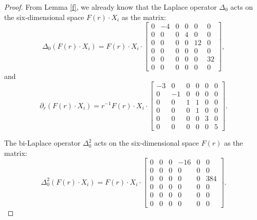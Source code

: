 \documentclass[11pt,letterpaper]{amsart}
\theoremstyle{definition}
\theoremstyle{remark}
\numberwithin{equation}{section}
\begin{document}
\begin{proof}
    From Lemma \ref{f}, we already know that 
    the Laplace operator $\Delta_0$ acts on the six-dimensional space $F(r)\cdot X_i$ as the matrix:
\begin{equation}
    \Delta_0(F(r)\cdot X_i)=F(r)\cdot X_i\cdot 
    \begin{bmatrix}
0 & -4 & 0 & 0 & 0& 0\\
0 & 0 & 0 & 4 & 0& 0\\
0 & 0 & 0 & 0 & 12& 0\\
0 & 0 & 0 & 0 & 0& 0\\
0 & 0 & 0 & 0 & 0& 32\\
0 & 0 & 0 & 0 & 0& 0
\end{bmatrix},
\end{equation}
and
\begin{equation*}
        \partial_r \left(F(r)\cdot X_i\right)=r^{-1}F(r)\cdot X_i\cdot\begin{bmatrix}
-3 & 0 & 0 & 0 & 0& 0\\
0 & -1 & 0 & 0 & 0& 0\\
0 & 0 & 1 & 1 & 0& 0\\
0 & 0 & 0 & 1 & 0& 0\\
0 & 0 & 0 & 0 & 3& 0\\
0 & 0 & 0 & 0 & 0& 5
        \end{bmatrix}.
    \end{equation*}

The bi-Laplace operator $\Delta^2_0$ acts on the six-dimensional space $F(r)$ as the matrix:
\begin{equation}
    \Delta^2_0(F(r)\cdot X_i)=F(r)\cdot X_i\cdot 
    \begin{bmatrix}
0 & 0 & 0 & -16 & 0& 0\\
0 & 0 & 0 & 0 & 0& 0\\
0 & 0 & 0 & 0 & 0& 384\\
0 & 0 & 0 & 0 & 0& 0\\
0 & 0 & 0 & 0 & 0& 0\\
0 & 0 & 0 & 0 & 0& 0
\end{bmatrix}.
\end{equation}


\end{proof}
\end{document}
